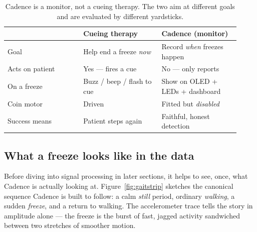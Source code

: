 \begin{table}[H]
\centering
\caption{Cadence is a monitor, not a cueing therapy. The two aim at different goals and
are evaluated by different yardsticks.}
\label{tab:monitor-vs-cue}
\small
\begin{tabular}{@{}p{0.30\linewidth} p{0.31\linewidth} p{0.31\linewidth}@{}}
\toprule
 & \textbf{Cueing therapy} & \textbf{Cadence (monitor)} \\
\midrule
Goal            & Help end a freeze \emph{now} & Record \emph{when} freezes happen \\
Acts on patient & Yes --- fires a cue          & No --- only reports \\
On a freeze     & Buzz / beep / flash to cue   & Show on OLED + LEDs + dashboard \\
Coin motor      & Driven                       & Fitted but \emph{disabled} \\
Success means    & Patient steps again          & Faithful, honest detection \\
\bottomrule
\end{tabular}
\end{table}

\subsection{What a freeze looks like in the data}

Before diving into signal processing in later sections, it helps to see, once, what
Cadence is actually looking at. Figure~\ref{fig:gaitstrip} sketches the canonical
sequence Cadence is built to follow: a calm \emph{still} period, ordinary \emph{walking},
a sudden \emph{freeze}, and a return to walking. The accelerometer trace tells the story
in amplitude alone --- the freeze is the burst of fast, jagged activity sandwiched
between two stretches of smoother motion.


